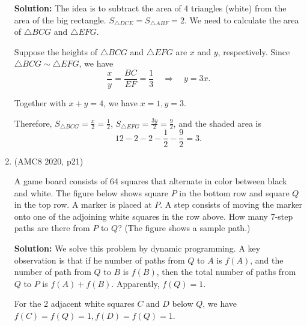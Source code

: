 \documentclass[11pt, oneside]{article}   	%
\begin{document}
\begin{enumerate}
\textbf{Solution:}
The idea is to subtract the area of 4 triangles (white) from the area of the big rectangle. $S_{\triangle DCE} = S_{\triangle ABF}= 2$. We need to calculate the area of $\triangle BCG$ and $\triangle EFG$.

Suppose the heights of $\triangle BCG$ and $\triangle EFG$ are $x$ and $y$, respectively. Since $\triangle BCG \sim \triangle EFG$,  we have 
\[\frac{x}{y}=\frac{BC}{EF}=\frac{1}{3} \quad \Rightarrow \quad y=3x.\]

Together with $x+y=4$, we have $x=1, y=3$. 

Therefore, $S_{\triangle BCG}=\frac{x}{2}=\frac{1}{2}$,  $S_{\triangle EFG}=\frac{3y}{2}=\frac{9}{2}$, and the shaded area is
\[12-2-2-\frac{1}{2}-\frac{9}{2}=3.\]

\item (AMC8 2020, p21) 

A game board consists of 64 squares that alternate in color between black and white. The figure below shows square $P$ in the bottom row and square $Q$ in the top row. A marker is placed at $P$. A step consists of moving the marker onto one of the adjoining white squares in the row above. How many 7-step paths are there from $P$ to $Q$? (The figure shows a sample path.)
\begin{center}


\end{center}

\textbf{Solution:}
We solve this problem by dynamic programming. A key observation is that if he number of paths from $Q$ to $A$  is $f(A)$, and the number of path from  $Q$ to $B$ is $f(B)$, then the total number of paths from $Q$ to $P$ is $f(A)+f(B)$. Apparently, $f(Q)=1$.

For the 2 adjacent white squares $C$ and $D$ below $Q$, we have $f(C) = f(Q) = 1, f(D) = f(Q) = 1$.


\end{enumerate}
\end{document}
